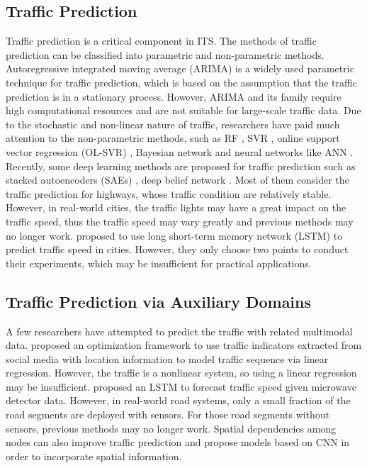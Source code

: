 \subsection{Traffic Prediction}
\label{trafficpred}
Traffic prediction is a critical component in ITS. The methods of traffic prediction can be classified into parametric and non-parametric methods. Autoregressive integrated moving average (ARIMA) \cite{ahmed1979analysis} is a widely used parametric technique for traffic prediction, which is based on the assumption that the traffic prediction is in a stationary process. However, ARIMA and its family require high computational resources and are not suitable for large-scale traffic data. Due to the stochastic and non-linear nature of traffic, researchers have paid much attention to the non-parametric methods, such as RF \cite{leshem2007traffic}, SVR \cite{jin2007simultaneously}, online support vector regression (OL-SVR) \cite{castro2009online}, Bayesian network \cite{sun2006bayesian} and neural networks like ANN \cite{vlahogianni2005optimized}. Recently, some deep learning methods are proposed for traffic prediction such as stacked autoencoders (SAEs) \cite{lv2015traffic}, deep belief network \cite{huang2014deep}. Most of them consider the traffic prediction for highways, whose traffic condition are relatively stable. However, in real-world cities, the traffic lights may have a great impact on the traffic speed, thus the traffic speed may vary greatly and previous methods may no longer work. \cite{ma2015long} proposed to use long short-term memory network (LSTM) to predict traffic speed in cities. However, they only choose two points to conduct their experiments, which may be insufficient for practical applications.

\subsection{Traffic Prediction via Auxiliary Domains}
A few researchers have attempted to predict the traffic with related multimodal data. \cite{he2013improving} \cite{liu2016collective} proposed an optimization framework to use traffic indicators extracted from social media with location information to model traffic sequence via linear regression. However, the traffic is a nonlinear system, so using a linear regression may be insufficient. \cite{ma2015long} proposed an LSTM to forecast traffic speed given microwave detector data. However, in real-world road systems, only a small fraction of the road segments are deployed with sensors. For those road segments without sensors, previous methods may no longer work. Spatial dependencies among nodes can also improve traffic prediction \cite{asif2014spatiotemporal} and  \cite{yu2017spatio,ma2017learning} propose models based on CNN in order to incorporate spatial information.

